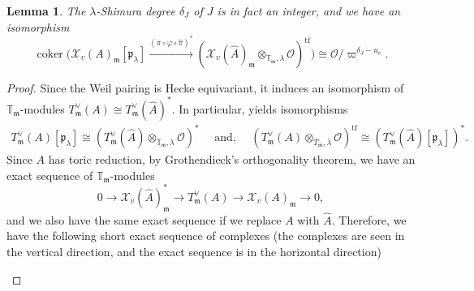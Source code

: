 \documentclass[10pt,a4paper]{amsart}
\newtheorem{lemma}{Lemma}
\newcommand{\bbT}{\mathbb T}
\newcommand{\coker}{\operatorname{coker}} %
\newcommand{\tf}{\operatorname{tf}} %
\begin{document}
\begin{lemma}\label{shimuradegonX}
    The $\lambda$-Shimura degree $\delta_J$ of $J$ is in fact an integer, and we have an isomorphism 
    $$ \coker\Big( \mathcal{X}_{v}(A)_{\mathfrak{m}} [\mathfrak{p}_\lambda]\xrightarrow{(\pi\circ\varphi\circ \hat{\pi})^*} (\mathcal{X}_v(\hat{A})_{\mathfrak{m}} \otimes_{\bbT_{\mathfrak{m}},\lambda}\mathcal{O})^{\tf}\Big)\cong \mathcal{O}/\varpi^{\delta_J-u_v}. $$
\end{lemma}

\begin{proof}
    Since the Weil pairing is Hecke equivariant, it induces an isomorphism of $\bbT_{\mathfrak{m}}$-modules $T_{\mathfrak{m}}^\vee(A) \cong T_{\mathfrak{m}}^\vee (\hat{A})^*$. In particular,  yields isomorphisms 
    \begin{align*}
        T^\vee_{\mathfrak{m}}(A)[\mathfrak{p}_\lambda]\cong (T_{\mathfrak{m}}^\vee(\hat{A})\otimes_{\bbT_{\mathfrak{m}},\lambda}\mathcal{O})^* \quad \text{ and, }\quad (T^\vee_{\mathfrak{m}}(A)\otimes_{T_{\mathfrak{m}},\lambda}\mathcal{O})^{\tf}\cong (T^\vee_{\mathfrak{m}}(\hat{A})[\mathfrak{p}_\lambda])^*.
    \end{align*}
    Since $A$ has toric reduction, by Grothendieck's orthogonality theorem, we have an exact sequence of $\bbT_{\mathfrak{m}}$-modules
    $$ 0 \to \mathcal{X}_v(\hat{A})_\mathfrak{m}^*\to T^\vee_{\mathfrak{m}}(A)\to \mathcal{X}_v(A)_{\mathfrak{m}}\to 0, $$
    and we also have the same exact sequence if we replace $A$ with $\hat{A}$. Therefore, we have the following short exact sequence of complexes (the complexes are seen in the vertical direction, and the exact sequence is in the horizontal direction)
    \begin{center}
\end{center}
\end{proof}
\end{document}
